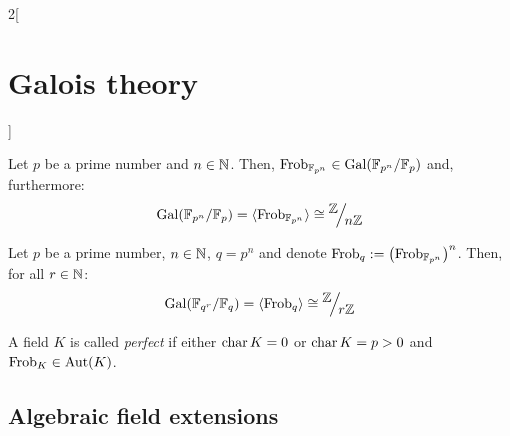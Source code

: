 \documentclass[../../../main.tex]{subfiles}
\begin{document}
\begin{multicols}{2}[\section{Galois theory}]
\begin{definition}
  \end{definition}
  \begin{theorem}
    Let $p$ be a prime number and $n\in\mathbb{N}$. Then, $\text{Frob}_{\FF_{p^n}}\in\Gal(\quot{\FF_{p^n}}{\FF_p})$ and, furthermore: $$\Gal(\FF_{p^n}/\FF_p)=\langle\text{Frob}_{\FF_{p^n}}\rangle\cong\quot{\ZZ}{n\ZZ}$$
  \end{theorem}
  \begin{corollary}
    Let $p$ be a prime number, $n\in\mathbb{N}$, $q=p^n$ and denote $\text{Frob}_q:={\left(\text{Frob}_{\mathbb{F}_{p^n}}\right)}^n$. Then, for all $r\in\mathbb{N}$: $$\Gal(\FF_{q^r}/\FF_q)=\langle\text{Frob}_q\rangle\cong\quot{\ZZ}{r\ZZ}$$
  \end{corollary}
  \begin{definition}
    A field $K$ is called \emph{perfect} if either $\operatorname{char} K=0$ or $\operatorname{char} K=p>0$ and $\text{Frob}_K\in\operatorname{Aut}(K)$.
  \end{definition}
  \subsection{Algebraic field extensions}

\end{multicols}
\end{document}

